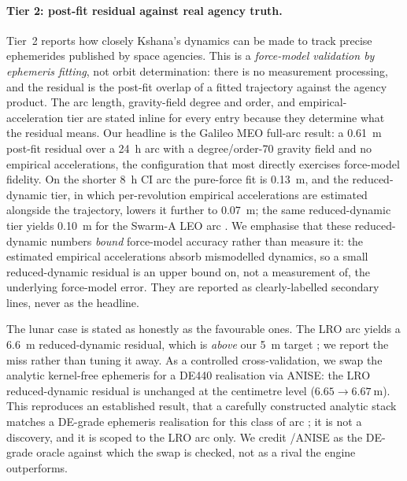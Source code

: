 \paragraph{Tier 2: post-fit residual against real agency truth.}
Tier~2 reports how closely Kshana's dynamics can be made to track precise
ephemerides published by space agencies. This is a \emph{force-model validation
by ephemeris fitting}, not orbit determination: there is no measurement
processing, and the residual is the post-fit overlap of a fitted trajectory
against the agency product. The arc length, gravity-field degree and order, and
empirical-acceleration tier are stated inline for every entry because they
determine what the residual means. Our headline is the Galileo MEO full-arc
result: a \SI{0.61}{\metre} post-fit residual over a \SI{24}{\hour} arc with a
degree/order-70 gravity field and no empirical accelerations, the configuration
that most directly exercises force-model fidelity. On the shorter \SI{8}{\hour} CI
arc the pure-force fit is \SI{0.13}{\metre}, and the reduced-dynamic tier, in
which per-revolution empirical accelerations are estimated alongside the
trajectory, lowers it further to \SI{0.07}{\metre}; the same reduced-dynamic tier
yields \SI{0.10}{\metre} for the Swarm-A LEO arc
\citep{montenbruck2000,petit2010iers}. We emphasise that these reduced-dynamic
numbers \emph{bound} force-model accuracy rather than measure it: the estimated
empirical accelerations absorb mismodelled dynamics, so a small reduced-dynamic
residual is an upper bound on, not a measurement of, the underlying force-model
error. They are reported as clearly-labelled secondary lines, never as the
headline.

The lunar case is stated as honestly as the favourable ones. The LRO arc yields
a \SI{6.6}{\metre} reduced-dynamic residual, which is \emph{above} our
\SI{5}{\metre} target \citep{lemoine2013grail,giorgini1996horizons}; we report
the miss rather than tuning it away. As a controlled cross-validation, we swap
the analytic kernel-free ephemeris for a DE440 realisation via ANISE: the LRO
reduced-dynamic residual is unchanged at the centimetre level
($6.65\rightarrow\SI{6.67}{\metre}$). This reproduces an established
result, that a carefully constructed analytic stack matches a DE-grade
ephemeris realisation for this class of arc \citep{bertone2021grail,li2023leopod};
it is not a discovery, and it is scoped to the LRO arc only. We credit
/ANISE \citep{nyxanise} as the DE-grade oracle against which the swap
is checked, not as a rival the engine outperforms.

